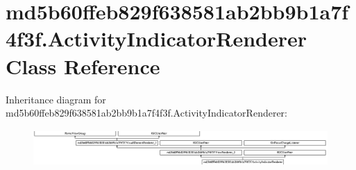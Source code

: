 \hypertarget{classmd5b60ffeb829f638581ab2bb9b1a7f4f3f_1_1ActivityIndicatorRenderer}{}\section{md5b60ffeb829f638581ab2bb9b1a7f4f3f.\+Activity\+Indicator\+Renderer Class Reference}
\label{classmd5b60ffeb829f638581ab2bb9b1a7f4f3f_1_1ActivityIndicatorRenderer}
Inheritance diagram for md5b60ffeb829f638581ab2bb9b1a7f4f3f.\+Activity\+Indicator\+Renderer\+:\begin{figure}[H]
\begin{center}
\leavevmode
\includegraphics[height=1.403509cm]{classmd5b60ffeb829f638581ab2bb9b1a7f4f3f_1_1ActivityIndicatorRenderer}
\end{center}
\end{figure}
